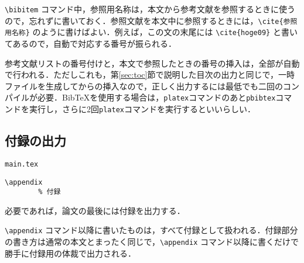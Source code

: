 \verb|\bibitem| コマンド中，参照用名称は，本文から参考文献を参照するときに使うので，忘れずに書いておく．参照文献を本文中に参照するときには，\verb|\cite{参照用名称}| のように書けばよい．例えば，この文の末尾には \verb|\cite{hoge09}| と書いてあるので，自動で対応する番号が振られる\cite{hoge09}\cite{hoge08}．

参考文献リストの番号付けと，本文で参照したときの番号の挿入は，全部が自動で行われる．ただしこれも，第\ref{sec:toc}節で説明した目次の出力と同じで，一時ファイルを生成してからの挿入なので，正しく出力するには最低でも二回のコンパイルが必要．BibTeXを使用する場合は，\verb|platex|コマンドのあと\verb|pbibtex|コマンドを実行し，さらに2回\verb|platex|コマンドを実行するといいらしい．



\subsection{付録の出力}

\begin{itembox}[l]{{\tt main.tex}}
\begin{verbatim}
\appendix
		% 付録
\end{verbatim}
\end{itembox}

必要であれば，論文の最後には付録を出力する．

\verb|\appendix| コマンド以降に書いたものは，すべて付録として扱われる．付録部分の書き方は通常の本文とまったく同じで，\verb|\appendix| コマンド以降に書くだけで勝手に付録用の体裁で出力される．
